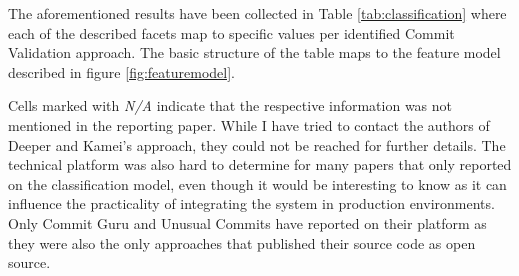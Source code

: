 The aforementioned results have been collected in Table \ref{tab:classification} where each of the described facets map to specific values per identified Commit Validation approach. The basic structure of the table maps to the feature model described in figure \ref{fig:featuremodel}. 

Cells marked with \textit{N/A} indicate that the respective information was not mentioned in the reporting paper. While I have tried to contact the authors of Deeper and Kamei's approach, they could not be reached for further details. The technical platform was also hard to determine for many papers that only reported on the classification model, even though it would be interesting to know as it can influence the practicality of integrating the system in production environments. Only Commit Guru and Unusual Commits have reported on their platform as they were also the only approaches that published their source code as open source.


